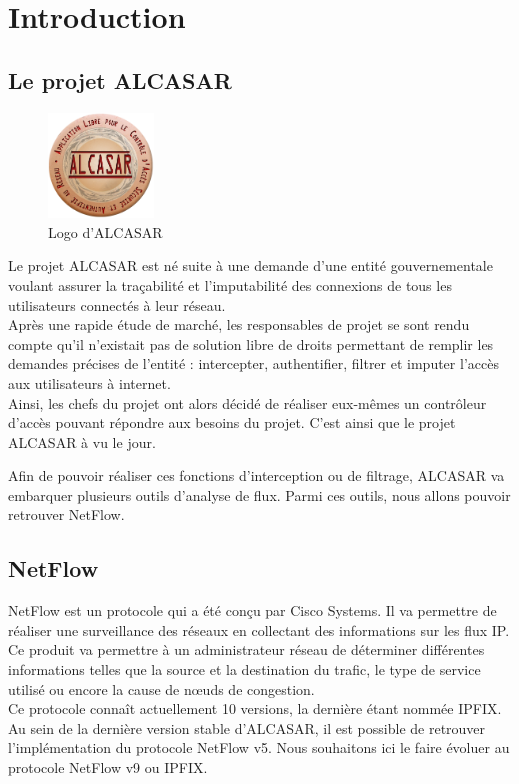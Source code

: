 \section{Introduction}
\subsection{Le projet ALCASAR}

\begin{figure}
  \vspace{-20pt}
  \begin{center}
    \includegraphics[width=0.25\textwidth]{img/Alcasar-logo.png}
  \end{center}
  \vspace{-15pt}
  \caption{Logo d'ALCASAR}
  \vspace{-10pt}
\end{figure}
Le projet ALCASAR est né suite à une demande d'une entité gouvernementale voulant assurer la traçabilité et l'imputabilité des connexions de tous les utilisateurs connectés à leur réseau.\\
Après une rapide étude de marché, les responsables de projet se sont rendu compte qu'il n'existait pas de solution libre de droits permettant de remplir les demandes précises de l'entité : intercepter, authentifier, filtrer et imputer l'accès aux utilisateurs à internet.\\
Ainsi, les chefs du projet ont alors décidé de réaliser eux-mêmes un contrôleur d'accès pouvant répondre aux besoins du projet. C'est ainsi que le projet ALCASAR à vu le jour.\\\par
Afin de pouvoir réaliser ces fonctions d'interception ou de filtrage, ALCASAR va embarquer plusieurs outils d'analyse de flux. Parmi ces outils, nous allons pouvoir retrouver NetFlow.

\subsection{NetFlow}

NetFlow est un protocole qui a été conçu par Cisco Systems. Il va permettre de réaliser une surveillance des réseaux en collectant des informations sur les flux IP. Ce produit va permettre à un administrateur réseau de déterminer différentes informations telles que la source et la destination du trafic, le type de service utilisé ou encore la cause de nœuds de congestion.\\
Ce protocole connaît actuellement 10 versions, la dernière étant nommée IPFIX.\\
Au sein de la dernière version stable d'ALCASAR, il est possible de retrouver l'implémentation du protocole NetFlow v5. Nous souhaitons ici le faire évoluer au protocole NetFlow v9 ou IPFIX.